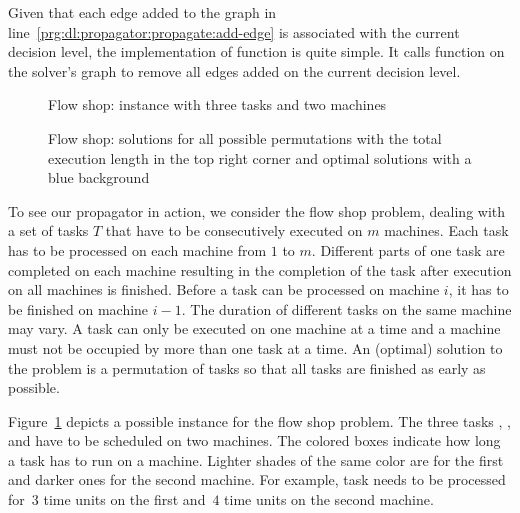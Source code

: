 Given that each edge added to the graph in line~\ref{prg:dl:propagator:propagate:add-edge} is associated with the current decision level,
the implementation of function  is quite simple.
It calls function  on the solver's graph to remove all edges added on the current decision level.

\begin{figure}[ht]
\centering
{\def\svgscale{.4}
}
\caption{Flow shop: instance with three tasks and two machines\label{fig:fs:ins}}
\end{figure}
\begin{figure}[ht]
\centering
{\def\svgwidth{\linewidth}
}
\caption{Flow shop: solutions for all possible permutations with the total execution length in the top right corner and optimal solutions with a blue background\label{fig:fs:sol}}
\end{figure}
%
To see our propagator in action, we consider the flow shop problem,
dealing with a set of tasks $T$ that have to be consecutively executed on $m$ machines.
%
Each task has to be processed on each machine from $1$ to $m$. 
Different parts of one task are completed on each machine resulting in the completion of the task after execution on all machines is finished.
Before a task can be processed on machine $i$, it has to be finished on machine $i-1$.
The duration of different tasks on the same machine may vary.
A task can only be executed on one machine at a time and
a machine must not be occupied by more than one task at a time.
%
An (optimal) solution to the problem is a permutation of tasks so that all tasks are finished as early as possible.

Figure~\ref{fig:fs:ins} depicts a possible instance for the flow shop problem.
The three tasks , , and  have to be scheduled on two machines.
The colored boxes indicate how long a task has to run on a machine.
Lighter shades of the same color are for the first and darker ones for the second machine.
For example, task  needs to be processed for~$3$ time units on the first and~$4$ time units on the second machine.

